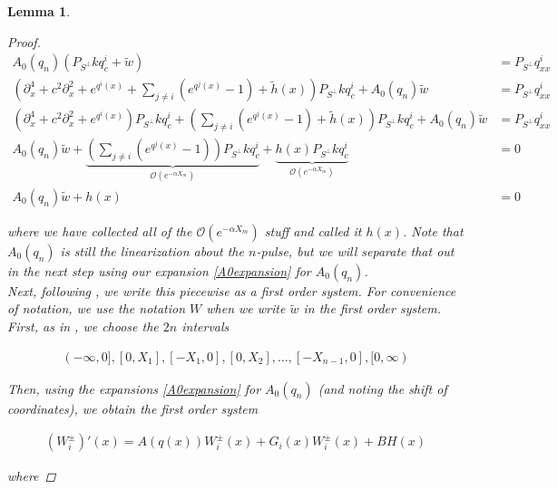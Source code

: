 \documentclass[12pt]{article}
\newtheorem{lemma}{Lemma}
\begin{document}
\begin{lemma}
\begin{proof}
\begin{align*}
A_0(q_n) (P_{S^\perp} k q^i_c + \tilde{w}) &= P_{S^\perp} q^i_{xx} \\
\left(\partial_x^4 + c^2 \partial_x^2 + e^{q^i(x)} + \sum_{j \neq i} (e^{q^j(x)} - 1) + \tilde{h}(x) \right)P_{S^\perp} k q^i_c + A_0(q_n) \tilde{w} &= P_{S^\perp} q^i_{xx} \\
(\partial_x^4 + c^2 \partial_x^2 + e^{q^i(x)})P_{S^\perp} k q^i_c + \left( \sum_{j \neq i} (e^{q^j(x)} - 1)+ \tilde{h}(x) \right) P_{S^\perp}k q^i_c + A_0(q_n) \tilde{w} &= P_{S^\perp} q^i_{xx} \\
A_0(q_n) \tilde{w} + \underbrace{\left( \sum_{j \neq i} (e^{q^j(x)} - 1)\right) P_{S^\perp} k q^i_c}_{\mathcal{O}(e^{-\alpha X_m})} 
+ \underbrace{h(x) P_{S^\perp}k q^i_c}_{\mathcal{O}(e^{-\alpha X_m})} &= 0 \\
A_0(q_n) \tilde{w} + h(x) &= 0
\end{align*}

where we have collected all of the $\mathcal{O}(e^{-\alpha X_m})$ stuff and called it $h(x)$. Note that $A_0(q_n)$ is still the linearization about the $n$-pulse, but we will separate that out in the next step using our expansion \eqref{A0expansion} for $A_0(q_n)$.\\

Next, following \cite{Sandstede1998}, we write this piecewise as a first order system. For convenience of notation, we use the notation $W$ when we write $\tilde{w}$ in the first order system. First, as in \cite{Sandstede1998}, we choose the $2n$ intervals 

\begin{align*}
(-\infty, 0], [0, X_1], [-X_1, 0], [0, X_2], \dots, [-X_{n-1}, 0], [0, \infty)
\end{align*}

Then, using the expansions \eqref{A0expansion} for $A_0(q_n)$ (and noting the shift of coordinates), we obtain the first order system

\begin{align*}
(W_i^\pm)'(x) = A(q(x)) W_i^\pm(x) + G_i(x) W_i^\pm(x) + B H(x)
\end{align*}

where


\end{proof}
\end{lemma}
\end{document}

